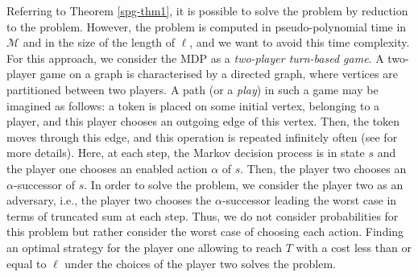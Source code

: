 Referring to Theorem \ref{spg-thm1}, it is possible to solve the \SPG{} problem by reduction to the \SSPP{} problem.
However, the \SSPP{} problem is computed in pseudo-polynomial time in $\mathcal{M}$ and in the size of the length of $\ell$, and we want to avoid this time complexity.
For this approach, we consider the MDP as a \textit{two-player turn-based game}.
A two-player game on a graph is characterised by a directed graph, where vertices are partitioned between two players.
A path (or a \textit{play}) in such a game may be imagined as follows:
a token is placed on some initial vertex, belonging to a player, and this player chooses an outgoing edge of this vertex.
Then, the token moves through this edge, and this operation is repeated infinitely often (see \cite{book:945785} for more details).
Here, at each step, the Markov decision process is in state $s$ and the player one chooses an enabled action $\alpha$ of $s$.
Then, the player two chooses an $\alpha$-successor of $s$. In order to solve the problem, we consider the player two as an adversary, i.e., the player two chooses the $\alpha$-successor leading the worst case in terms of truncated sum at each step.
Thus, we do not consider probabilities for this problem but rather consider the worst case of choosing each action.
Finding an optimal strategy for the player one allowing to reach $T$ with a cost less than or equal to $\ell$
under the choices of the player two solves the \SPG{} problem. \\

